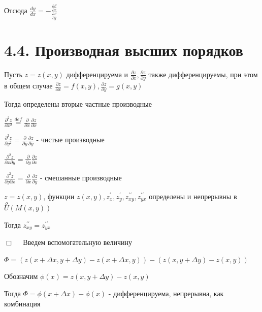 \documentclass[12pt]{article}
\begin{document}
    Отсюда $\displaystyle \frac{dy}{dx} = -\frac{\frac{\partial F}{\partial x}}{\frac{\partial F}{\partial y}}$
    
    \vspace{8mm}

    \section{4.4. Производная высших порядков}

    \Nota Пусть $\displaystyle z = z(x, y)$ дифференцируема и $\displaystyle \frac{\partial z}{\partial x}, \frac{\partial z}{\partial y}$ также дифференцируемы, при этом в общем случае
    $\displaystyle \frac{\partial z}{\partial x} = f(x, y), \frac{\partial z}{\partial y} = g(x, y)$

    Тогда определены вторые частные производные
    
    \vspace{3mm}

    \Def $\displaystyle \frac{\partial^2 z}{\partial x^2} \stackrel{def}{=} \frac{\partial}{\partial x} \frac{\partial z}{\partial x}$

    $\displaystyle \frac{\partial^2 z}{\partial y^2} = \frac{\partial}{\partial y} \frac{\partial z}{\partial y}$ - чистые производные


    $\displaystyle \frac{\partial^2 z}{\partial x \partial y} = \frac{\partial}{\partial y} \frac{\partial z}{\partial x}$

    $\displaystyle \frac{\partial^2 z}{\partial y \partial x} = \frac{\partial}{\partial x} \frac{\partial z}{\partial y}$ - смешанные производные

    \vspace{3mm}

    \Th $\displaystyle z = z(x, y)$, функции $\displaystyle z(x, y), z^\prime_x, z^\prime_y, z^{\prime\prime}_{xy}, z^{\prime\prime}_{yx}$ определены и непрерывны в $\displaystyle \stackrel{o}{U}(M(x, y))$

    Тогда $\displaystyle z^{\prime\prime}_{xy} = z^{\prime\prime}_{yx}$

    $\displaystyle \Box \quad$ Введем вспомогательную величину

    $\displaystyle \Phi = (z(x + \Delta x, y + \Delta y) - z(x + \Delta x, y)) - (z(x, y + \Delta y) - z(x, y))$

    Обозначим $\displaystyle \phi(x) = z(x, y + \Delta y) - z(x, y)$

    Тогда $\displaystyle \Phi = \phi(x + \Delta x) - \phi(x)$ - дифференцируема, непрерывна, как комбинация
\end{document}
